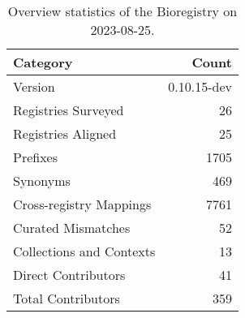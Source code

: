 \begin{table}
\caption{Overview statistics of the Bioregistry on 2023-08-25.}
\label{tab:bioregistry-summary}
\begin{tabular}{lr}
\toprule
Category & Count \\
\midrule
Version & 0.10.15-dev \\
Registries Surveyed & 26 \\
Registries Aligned & 25 \\
Prefixes & 1705 \\
Synonyms & 469 \\
Cross-registry Mappings & 7761 \\
Curated Mismatches & 52 \\
Collections and Contexts & 13 \\
Direct Contributors & 41 \\
Total Contributors & 359 \\
\bottomrule
\end{tabular}
\end{table}
